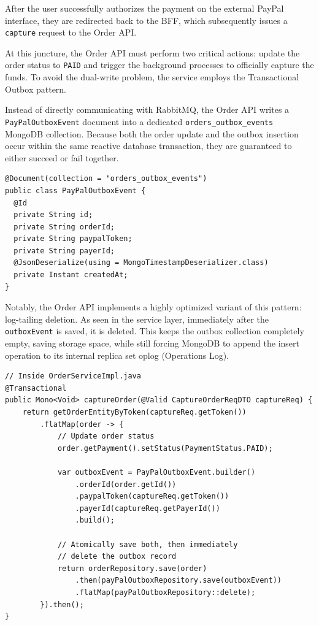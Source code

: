 After the user successfully authorizes the payment on the external PayPal interface, they are redirected back to the BFF, which subsequently issues a \texttt{capture} request to the Order API. 

At this juncture, the Order API must perform two critical actions: update the order status to \texttt{PAID} and trigger the background processes to officially capture the funds. To avoid the dual-write problem, the service employs the Transactional Outbox pattern. 

Instead of directly communicating with RabbitMQ, the Order API writes a \texttt{PayPalOutboxEvent} document into a dedicated \texttt{orders\_outbox\_events} MongoDB collection. Because both the order update and the outbox insertion occur within the same reactive database transaction, they are guaranteed to either succeed or fail together.

\clearpage

\begin{lstlisting}[language=JavaExtended, caption={Transactional Outbox Event Model}, label={lst:outbox_event}]
@Document(collection = "orders_outbox_events")
public class PayPalOutboxEvent {
  @Id
  private String id;
  private String orderId;
  private String paypalToken;
  private String payerId;
  @JsonDeserialize(using = MongoTimestampDeserializer.class)
  private Instant createdAt;
}
\end{lstlisting}

Notably, the Order API implements a highly optimized variant of this pattern: log-tailing deletion. As seen in the service layer, immediately after the \texttt{outboxEvent} is saved, it is deleted. This keeps the outbox collection completely empty, saving storage space, while still forcing MongoDB to append the insert operation to its internal replica set oplog (Operations Log).

\begin{lstlisting}[language=JavaExtended, caption={Transactional Outbox Implementation}, label={lst:outbox_impl}]
// Inside OrderServiceImpl.java
@Transactional
public Mono<Void> captureOrder(@Valid CaptureOrderReqDTO captureReq) {
    return getOrderEntityByToken(captureReq.getToken())
        .flatMap(order -> {
            // Update order status
            order.getPayment().setStatus(PaymentStatus.PAID);
            
            var outboxEvent = PayPalOutboxEvent.builder()
                .orderId(order.getId())
                .paypalToken(captureReq.getToken())
                .payerId(captureReq.getPayerId())
                .build();

            // Atomically save both, then immediately 
            // delete the outbox record
            return orderRepository.save(order)
                .then(payPalOutboxRepository.save(outboxEvent))
                .flatMap(payPalOutboxRepository::delete);
        }).then();
}
\end{lstlisting}

